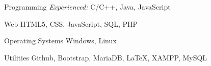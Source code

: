 

\begin{cvskills}

  \cvskill
    {Programming} %
    {\iffalse{\em Proficient:}\hspace{0.5em}\fi {\em Experienced:} C/C++, Java, JavaScript } %

  \cvskill
    {Web} %
    {HTML5, CSS, JavaScript, SQL, PHP} %

  \cvskill
    {Operating Systems} %
    {Windows, Linux} %

  \cvskill
    {Utilities} %
    {Github, Bootstrap, MariaDB, \LaTeX, XAMPP, MySQL} %
    
\end{cvskills}
